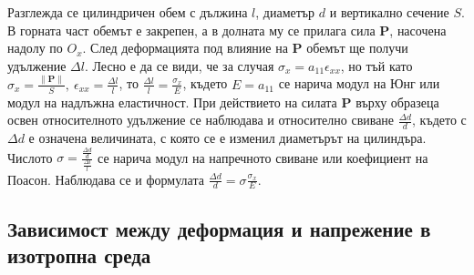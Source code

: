 \documentclass{report}
\begin{document}
	Разглежда се цилиндричен обем с дължина $l$, диаметър $d$ и вертикално сечение $S$. В горната част обемът е закрепен, а в долната му се прилага сила $\mathbf{P}$, насочена надолу по $O_x$. След деформацията под влияние на $\mathbf{P}$ обемът ще получи удължение $\Delta l$. Лесно е да се види, че за случая $\sigma_x = a_{11}\epsilon_{xx}$, но тъй като $\displaystyle \sigma_x = \frac{\|\mathbf{P}\|}{S},~\epsilon_{xx}=\frac{\Delta l}{l}$, то $\displaystyle \frac{\Delta l}{l}=\frac{\sigma_x}{E}$, където $E=a_{11}$ се нарича модул на Юнг или модул на надлъжна еластичност. При действието на силата $\mathbf{P}$ върху образеца освен относителното удължение се наблюдава и относително свиване $\frac{\Delta d}{d}$, където с $\Delta d$ е означена величината, с която се е изменил диаметърът на цилиндъра. Числото $\displaystyle \sigma = \frac{\frac{\Delta d}{d}}{\frac{\Delta l}{l}}$ се нарича модул на напречното свиване или коефициент на Поасон. Наблюдава се и формулата $\frac{\Delta d}{d}=\sigma\frac{\sigma_x}{E}$.
	
	\subsection{Зависимост между деформация и напрежение в изотропна среда}
	
\end{document}
